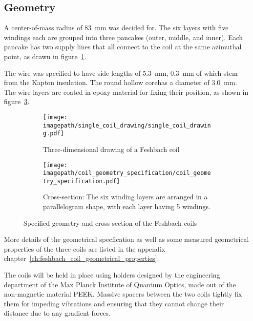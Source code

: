 \subsection*{Geometry}
A center-of-mass radius of \SI{83}{\milli\meter} was decided for. The six layers with five windings each are grouped into three pancakes (outer, middle, and inner). Each pancake has two supply lines that all connect to the coil at the same azimuthal point, as drawn in figure~\ref{fig:single_coil_drawing}. 

The wire was specified to have side lengths of \SI{5.3}{\milli\meter}, \SI{0.3}{\milli\meter} of which stem from the Kapton insulation. The round hollow corehas a diameter of \SI{3.0}{\milli\meter}. The wire layers are coated in epoxy material for fixing their position, as shown in figure~\ref{fig:coil_geometry_specification}.

\begin{figure}
    \centering
    \begin{subfigure}[t]{0.48\textwidth}
        \centering
        \texttt{[image: \\imagepath/single\_coil\_drawing/single\_coil\_drawing.pdf]}
        \caption{Three-dimensional drawing of a Feshbach coil}
        \label{fig:single_coil_drawing}
    \end{subfigure}
    \hspace{0.03\textwidth}
    \begin{subfigure}[t]{0.48\textwidth}
        \centering
        \texttt{[image: \\imagepath/coil\_geometry\_specification/coil\_geometry\_specification.pdf]}
        \caption{Cross-section: The six winding layers are arranged in a parallelogram shape, with each layer having 5 windings.}
        \label{fig:coil_geometry_specification}
    \end{subfigure}
    \caption{Specified geometry and cross-section of the Feshbach coils}
\end{figure}

More details of the geometrical specfication as well as some measured geometrical properties of the three coils are listed in the appendix chapter~\ref{ch:feshbach_coil_geometrical_properties}.

The coils will be held in place using holders designed by the engineering department of the Max Planck Institute of Quantum Optics, made out of the non-magnetic material PEEK. Massive spacers between the two coils tightly fix them for impeding vibrations and ensuring that they cannot change their distance due to any gradient forces.

